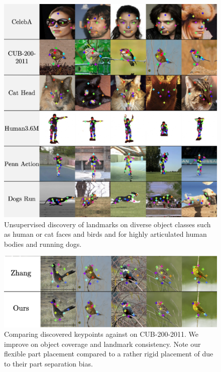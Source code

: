 %
\begin{figure}[t]
	\centering
	\includegraphics[trim={0cm 0cm 0cm 0cm},clip, width=1.\linewidth]{fig/kp_mania}
	\caption{{Unsupervised discovery of landmarks on diverse object classes such as human or cat faces and birds and for highly articulated human bodies and running dogs.}}
	\label{fig:kp_mania}
\end{figure}
%
\begin{figure}[t]
	\centering
	\includegraphics[trim={0cm 0cm 0cm 0cm},clip, width=1.\linewidth]{fig/birds1x3}
	\caption{Comparing discovered keypoints against \cite{Zhang:2018vz} on CUB-200-2011. We improve on object coverage and landmark consistency. Note our flexible part placement compared to a rather rigid placement of \cite{Zhang:2018vz} due to their part separation bias.}
	\label{fig:compare}
\end{figure}
